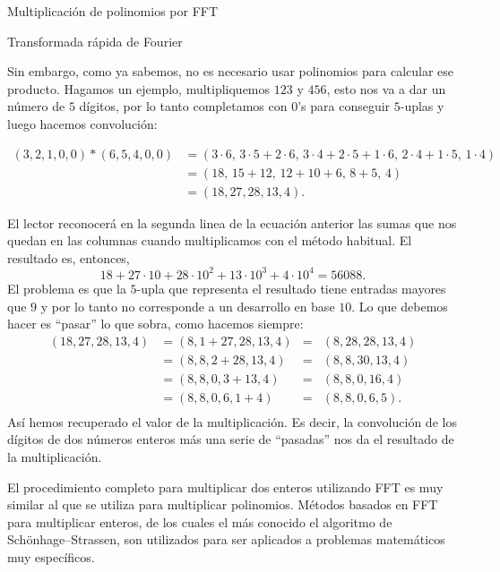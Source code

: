 \begin{chapter}{Multiplicación de polinomios por FFT}
\begin{section}{Transformada rápida de Fourier}
\begin{ejemplo*}
      Sin embargo, como ya sabemos, no es necesario usar polinomios para calcular ese producto. Hagamos un ejemplo, multipliquemos $123$ y $456$, esto nos va a dar un número de $5$ dígitos, por lo tanto completamos con $0$'s para conseguir $5$-uplas y luego hacemos convolución:
      \begin{small}
          \begin{align*}
              (3,2,1,0,0)*(6,5,4,0,0) & = (3\cdot 6,\, 3\cdot  5 + 2\cdot 6 ,\, 3\cdot 4 +  2\cdot 5+ 1\cdot 6,\, 2\cdot 4 + 1 \cdot 5,\,1 \cdot 4) \\
                                      & = (18,\, 15 + 12,\, 12 +10 +6,\, 8 +5,\, 4)                                                                 \\
                                      & = (18, 27, 28, 13, 4).
          \end{align*}
      \end{small}
      El lector reconocerá en la segunda linea de la ecuación anterior las sumas que nos quedan en las columnas cuando multiplicamos con el método habitual. El resultado es, entonces,
      \begin{equation*}
          18+ 27 \cdot 10 + 28 \cdot 10^2 +  13\cdot 10^3 + 4 \cdot 10^4 = 56088.
      \end{equation*}
      El problema es que la $5$-upla que representa el resultado tiene entradas mayores que $9$ y por lo tanto no corresponde a un desarrollo en base $10$. Lo  que debemos hacer es ``pasar'' lo que sobra, como hacemos siempre:
      \begin{align*}
          (18, 27, 28, 13, 4) & = (8,1 + 27, 28, 13, 4) &=& (8,28, 28, 13, 4) \\
                              & = (8,8, 2+28, 13, 4)  &=& (8,8, 30, 13, 4)    \\
                              & = (8,8, 0, 3+13, 4)  &=& (8,8, 0, 16, 4)     \\
                              & = (8,8, 0, 6, 1+4)   &=& (8,8, 0, 6, 5).    \\
      \end{align*}
      Así hemos recuperado el valor de la multiplicación. Es decir, la convolución de los dígitos de dos números enteros más una serie de ``pasadas'' nos da el resultado de la multiplicación.

      El procedimiento completo para multiplicar dos enteros utilizando FFT es muy similar al que se utiliza para multiplicar polinomios. Métodos basados en FFT para multiplicar enteros, de los cuales el más conocido el algoritmo de Schönhage–Strassen, son utilizados para ser aplicados a problemas matemáticos muy específicos.

  \end{ejemplo*}



 \end{section}


\end{chapter}

